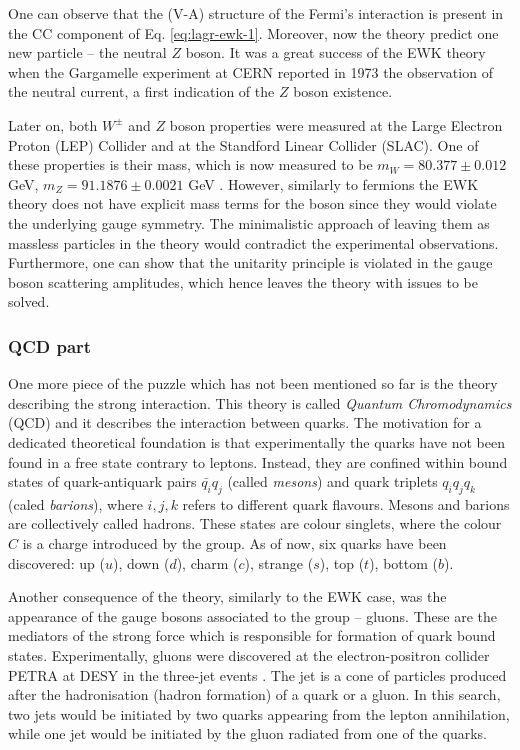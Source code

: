 One can observe that the (V-A) structure of the Fermi's interaction is present in the CC component of Eq. \ref{eq:lagr-ewk-1}. Moreover, now the theory predict one new particle -- the neutral $Z$ boson. It was a great success of the EWK theory when the Gargamelle experiment at CERN reported in 1973 the observation of the neutral current, a first indication of the $Z$ boson existence.   

Later on, both $W^\pm$ and $Z$ boson properties were measured at the Large Electron Proton (LEP) Collider and  at the Standford Linear Collider (SLAC). One of these properties is their mass, which is now measured to be $m_W = 80.377 \pm 0.012$ GeV, $m_Z = 91.1876 \pm 0.0021$ GeV \cite{ParticleDataGroup:2020ssz}. However, similarly to fermions the EWK theory does not have explicit mass terms for the boson since they would violate the underlying gauge symmetry. The minimalistic approach of leaving them as massless particles in the theory would contradict the experimental observations. Furthermore, one can show that the unitarity principle is violated in the gauge boson scattering amplitudes, which hence leaves the theory with issues to be solved.   

\subsubsection{QCD part}

One more piece of the puzzle which has not been mentioned so far is the theory describing the strong interaction. This theory is called \textit{Quantum Chromodynamics} (QCD) and it describes the interaction between quarks. The motivation for a dedicated theoretical foundation is that experimentally the quarks have not been found in a free state contrary to leptons. Instead, they are confined within bound states of quark-antiquark pairs $\bar{q_i}q_j$ (called \textit{mesons}) and quark triplets $q_iq_jq_k$ (caled \textit{barions}), where $i,j,k$ refers to different quark flavours. Mesons and barions are collectively called hadrons. These states are colour singlets, where the colour $C$ is a charge introduced by the \suthr group. As of now, six quarks have been discovered: up ($u$), down ($d$), charm ($c$), strange ($s$), top ($t$), bottom ($b$).

Another consequence of the theory, similarly to the EWK case, was the appearance of the gauge bosons associated to the group -- gluons. These are the mediators of the strong force which is responsible for formation of quark bound states. Experimentally, gluons were discovered at the electron-positron collider PETRA at DESY in the three-jet events \cite{Barber:1979yr}. The jet is a cone of particles produced after the hadronisation (hadron formation) of a quark or a gluon. In this search, two jets would be initiated by two quarks appearing from the lepton annihilation, while one jet would be initiated by the gluon radiated from one of the quarks.  

